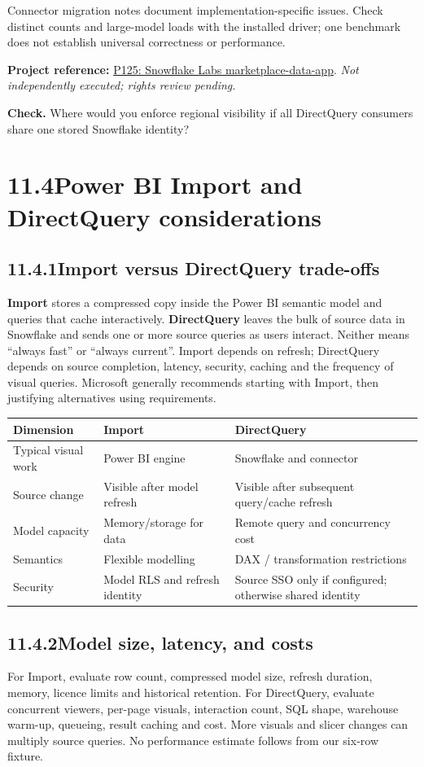 \documentclass[11pt,twoside]{article}
\newcommand{\topic}[2]{\subsection*{#1\quad #2}}
\newcommand{\repo}[2]{\par\begingroup\fontsize{8.0}{9.6}\selectfont\sffamily\color{inkgray}\textbf{Project reference:} \href{#2}{#1}. \textit{Not independently executed; rights review pending.}\par\endgroup}
\begin{document}
Connector migration notes document implementation-specific issues. Check distinct counts and large-model loads with the installed driver; one benchmark does not establish universal correctness or performance.
\repo{P125: Snowflake Labs marketplace-data-app}{https://github.com/Snowflake-Labs/sfguide-marketplace-data-app}
\textbf{Check.} Where would you enforce regional visibility if all DirectQuery consumers share one stored Snowflake identity?
\newpage
\section*{11.4\quad Power BI Import and DirectQuery considerations}
\topic{11.4.1}{Import versus DirectQuery trade-offs}
\textbf{Import} stores a compressed copy inside the Power BI semantic model and queries that cache interactively. \textbf{DirectQuery} leaves the bulk of source data in Snowflake and sends one or more source queries as users interact. Neither means ``always fast'' or ``always current''. Import depends on refresh; DirectQuery depends on source completion, latency, security, caching and the frequency of visual queries. Microsoft generally recommends starting with Import, then justifying alternatives using requirements.
\begin{center}\renewcommand{\arraystretch}{1.13}\begin{tabularx}{\linewidth}{@{}p{26mm}XX@{}}\toprule
\textbf{Dimension}&\textbf{Import}&\textbf{DirectQuery}\\\midrule
Typical visual work&Power BI engine&Snowflake and connector\\
Source change&Visible after model refresh&Visible after subsequent query/cache refresh\\
Model capacity&Memory/storage for data&Remote query and concurrency cost\\
Semantics&Flexible modelling&DAX / transformation restrictions\\
Security&Model RLS and refresh identity&Source SSO only if configured; otherwise shared identity\\\bottomrule\end{tabularx}\end{center}
\topic{11.4.2}{Model size, latency, and costs}
For Import, evaluate row count, compressed model size, refresh duration, memory, licence limits and historical retention. For DirectQuery, evaluate concurrent viewers, per-page visuals, interaction count, SQL shape, warehouse warm-up, queueing, result caching and cost. More visuals and slicer changes can multiply source queries. No performance estimate follows from our six-row fixture.
\end{document}
